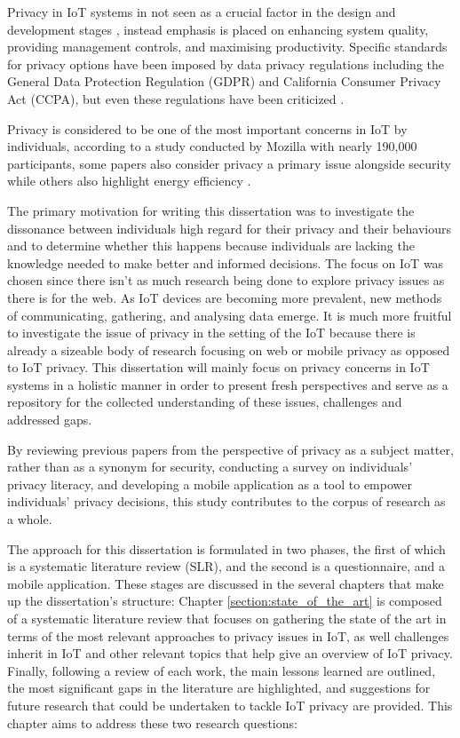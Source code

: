 Privacy in IoT systems in not seen as a crucial factor in the design and
development stages \cite{alhirabi2021security}, instead emphasis is placed
on enhancing system quality, providing management controls, and maximising productivity.
Specific standards for privacy options have been imposed by data privacy
regulations including the General Data Protection Regulation (GDPR) and
California Consumer Privacy Act (CCPA), but even these regulations have
been criticized \cite{peloquin2020disruptive, gladis2022weaponizing, gentile2022deficient, green2022flaws, byun2019privacy}.

Privacy is considered to be one of the most important concerns in IoT by
individuals, according to a study conducted by Mozilla \cite{Jen2017ten}
with nearly 190,000 participants, some papers \cite{khan2021issues, MOHAMMADZADEH2018124}
also consider privacy a primary issue alongside security while others also highlight
energy efficiency \cite{sisinni2018industrial}.

The primary motivation for writing this dissertation was to investigate
the dissonance between individuals high regard for their privacy
and their behaviours and to determine whether this happens because individuals
are lacking the knowledge needed to make better and informed decisions.
The focus on IoT was chosen since there isn't as much research being done to
explore privacy issues as there is for the web. As IoT devices are becoming
more prevalent, new methods of communicating,
gathering, and analysing data emerge.
It is much more fruitful to investigate the issue of privacy in the setting
of the IoT because there is already a sizeable body of research focusing on
web or mobile privacy as opposed to IoT privacy. This dissertation will mainly
focus on privacy concerns in IoT systems in a holistic manner in order to present
fresh perspectives and serve as a repository for the collected understanding of
these issues, challenges and addressed gaps.

By reviewing previous papers from the perspective of privacy as a subject matter,
rather than as a synonym for security, conducting a survey on individuals' privacy literacy,
and developing a mobile application as a tool to empower individuals' privacy decisions,
this study contributes to the corpus of research as a whole.

The approach for this dissertation is formulated in two phases, the first of
which is a systematic literature review (SLR), and the second is a questionnaire, and
a mobile application. These stages are discussed
in the several chapters that make up the dissertation's structure: Chapter \ref{section:state_of_the_art}
is composed of a systematic literature review that focuses on gathering the state
of the art in terms of the most relevant approaches to privacy issues in IoT, as
well challenges inherit in IoT and other relevant topics that help give an
overview of IoT privacy. Finally, following a review of each work, the main lessons
learned are outlined, the most significant gaps in the literature are highlighted,
and suggestions for future research that could be undertaken to tackle IoT privacy
are provided. This chapter aims to address these two research questions:\\

